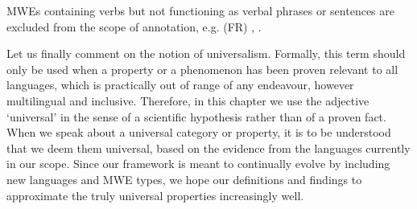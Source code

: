 \documentclass[output=paper,modfonts]{langscibook}
\begin{document}
MWEs containing verbs but not functioning as verbal phrases or sentences  
are excluded from the scope of annotation, e.g. (FR) , .

Let us finally comment on the notion of universalism. Formally, this term should only be used when a property or a phenomenon has been proven relevant to all languages, which is practically out of range of any endeavour, however multilingual and inclusive. Therefore, in this chapter we use the adjective `universal' in the sense of a scientific hypothesis rather than of a proven fact. When we speak about a universal category or property, it is to be understood that we deem them universal, based on the evidence from the languages currently in our scope. Since our framework is meant to continually evolve by including new languages and MWE types, we hope our definitions and findings to approximate the truly universal properties increasingly well.
\end{document}
